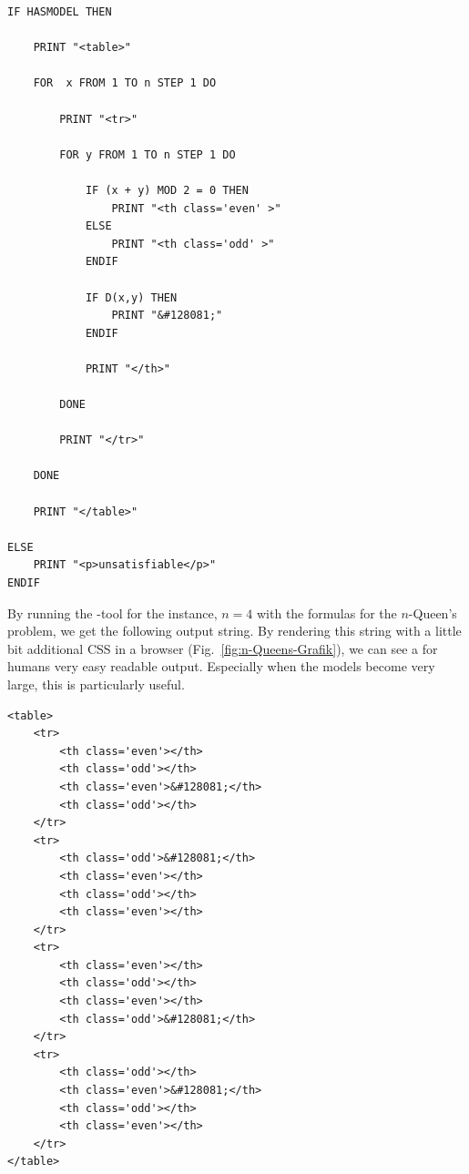 \documentclass[twoside]{article}
\begin{document}
\begin{verbatim}
IF HASMODEL THEN

    PRINT "<table>"

    FOR  x FROM 1 TO n STEP 1 DO

        PRINT "<tr>"

        FOR y FROM 1 TO n STEP 1 DO

            IF (x + y) MOD 2 = 0 THEN
                PRINT "<th class='even' >"
            ELSE
                PRINT "<th class='odd' >"
            ENDIF

            IF D(x,y) THEN
                PRINT "&#128081;"
            ENDIF

            PRINT "</th>"

        DONE
        
        PRINT "</tr>"
        
    DONE
    
    PRINT "</table>"
    
ELSE
    PRINT "<p>unsatisfiable</p>"
ENDIF

\end{verbatim}
By running the \DiMo-tool for the instance, $n = 4$ with the formulas for the $n$-Queen's problem, we get the following output string. By rendering this string with a little bit additional CSS in a browser (Fig.~\ref{fig:n-Queens-Grafik}), we can see a for humans very easy readable output. Especially when the models become very large, this is particularly useful. 
\begin{verbatim}
<table>
    <tr>
        <th class='even'></th>
        <th class='odd'></th>
        <th class='even'>&#128081;</th>
        <th class='odd'></th>
    </tr>
    <tr>
        <th class='odd'>&#128081;</th>
        <th class='even'></th>
        <th class='odd'></th>
        <th class='even'></th>
    </tr>
    <tr>
        <th class='even'></th>
        <th class='odd'></th>
        <th class='even'></th>
        <th class='odd'>&#128081;</th>
    </tr>
    <tr>
        <th class='odd'></th>
        <th class='even'>&#128081;</th>
        <th class='odd'></th>
        <th class='even'></th>
    </tr>
</table>
\end{verbatim}
\end{document}
